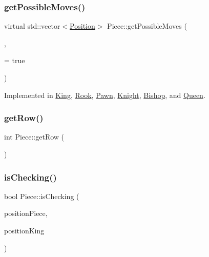 \mbox{\label{class_piece_a8891924c280568529878549f59541925}} 
\subsubsection{\texorpdfstring{get\+Possible\+Moves()}{getPossibleMoves()}}
{\footnotesize\ttfamily virtual std\+::vector$<$\hyperlink{struct_position}{Position}$>$ Piece\+::get\+Possible\+Moves (\begin{DoxyParamCaption}\item[{std\+::shared\+\_\+ptr$<$ \hyperlink{class_base_board}{Base\+Board} $>$}]{,  }\item[{bool}]{ = {\ttfamily true} }\end{DoxyParamCaption})\hspace{0.3cm}{\ttfamily [pure virtual]}}



Implemented in \hyperlink{class_king_ac320306876c17161cba6db2f4255751a}{King}, \hyperlink{class_rook_ab186037a1f596102d618c1c9df31490d}{Rook}, \hyperlink{class_pawn_a54eddd8724008c910f34c5c49374d5c5}{Pawn}, \hyperlink{class_knight_a65f4e2cdeafefd7e4a7d3c9bca051a5a}{Knight}, \hyperlink{class_bishop_aed393094415a51e98e0c300da7f79100}{Bishop}, and \hyperlink{class_queen_ab599f550fe04cda1f421e657841022fd}{Queen}.

\mbox{\label{class_piece_a070f593242fb8417429ac989184e682b}} 
\subsubsection{\texorpdfstring{get\+Row()}{getRow()}}
{\footnotesize\ttfamily int Piece\+::get\+Row (\begin{DoxyParamCaption}{ }\end{DoxyParamCaption})}

\mbox{\label{class_piece_aa45b0c7c5552437dfd9d4567d2c7e7dd}} 
\subsubsection{\texorpdfstring{is\+Checking()}{isChecking()}}
{\footnotesize\ttfamily bool Piece\+::is\+Checking (\begin{DoxyParamCaption}\item[{\hyperlink{struct_position}{Position}}]{position\+Piece,  }\item[{\hyperlink{struct_position}{Position}}]{position\+King }\end{DoxyParamCaption})}

